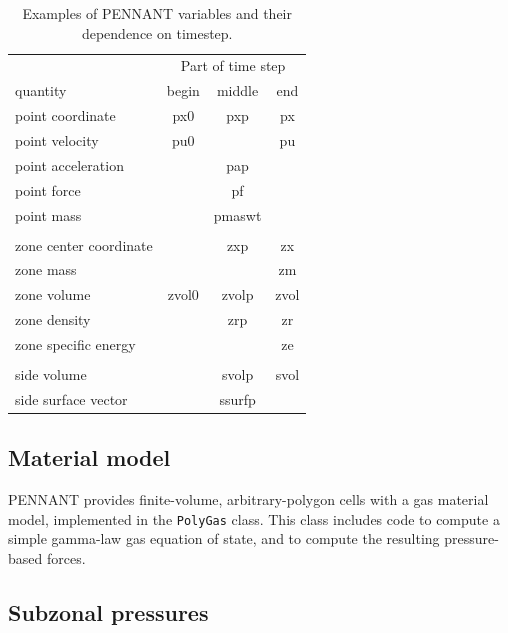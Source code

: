 \documentclass[11pt,letterpaper]{article} %
\begin{document}
\begin{table}
\centering
\caption{Examples of PENNANT variables and their dependence on timestep.}
\label{tbl:timestep}
\begin{tabular}{lccc}
    \hline
    & \multicolumn{3}{c}{Part of time step} \\
    quantity & begin & middle & end \\
    \hline
    point coordinate       &   px0     &   pxp     &   px  \\
    point velocity         &   pu0     &           &   pu    \\
    point acceleration     &           &   pap  \\
    point force            &           &   pf  \\
    point mass             &           &   pmaswt  \\
    \\
    zone center coordinate &           &   zxp      &   zx  \\
    zone mass              &           &           &   zm      \\
    zone volume            &   zvol0   &   zvolp   &   zvol       \\
    zone density           &           &   zrp      &   zr      \\
    zone specific energy   &           &           &   ze  \\
    \\
    side volume            &           &   svolp    &   svol    \\
    side surface vector    &           &   ssurfp \\
    \hline
\end{tabular}
\end{table}


\subsection{Material model}

PENNANT provides finite-volume, arbitrary-polygon cells with a
gas material model, implemented in the {\tt PolyGas} class.
This class includes code to compute a simple gamma-law gas
equation of state, and to compute the resulting pressure-based
forces.


\subsection{Subzonal pressures}
\end{document}
